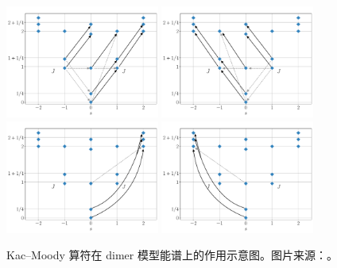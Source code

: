 \begin{figure}[ht]
  \centering
  \includegraphics[width=0.45\textwidth]{images/virasoro/dimer-jm1.pdf}    \quad
  \includegraphics[width=0.45\textwidth]{images/virasoro/dimer-jbarm1.pdf} \\
  \includegraphics[width=0.45\textwidth]{images/virasoro/dimer-jm2.pdf}    \quad
  \includegraphics[width=0.45\textwidth]{images/virasoro/dimer-jbarm2.pdf}
  \caption[Kac--Moody 算符在 dimer 模型能谱上的作用示意图]{Kac--Moody 算符在 dimer 模型能谱上的作用示意图。图片来源：\parencite{wang2022virasoro}。}
  \label{fig:dimer-kac-moody-all}
\end{figure}

